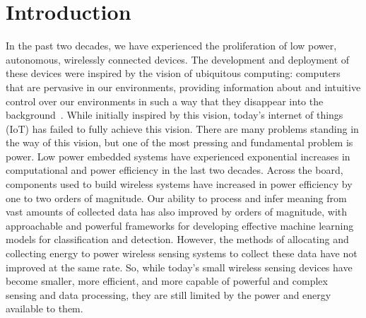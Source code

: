 \chapter{Introduction}
\label{chap:intro}

In the past two decades, we have experienced the proliferation of low power, autonomous, wirelessly connected devices.
The development and deployment of these devices were inspired by the vision of ubiquitous computing: computers that are pervasive in our environments, providing information about and intuitive control over our environments in such a way that they disappear into the background~\cite{weiser1991computer}.
While initially inspired by this vision, today's internet of things (IoT) has failed to fully achieve this vision.
There are many problems standing in the way of this vision, but one of the most pressing and fundamental problem is power.
Low power embedded systems have experienced exponential increases in computational and power efficiency in the last two decades. Across the board, components used to build wireless systems have increased in power efficiency by one to two orders of magnitude.
Our ability to process and infer meaning from vast amounts of collected data has also improved by orders of magnitude, with approachable and powerful frameworks for developing effective machine learning models for classification and detection.
However, the methods of allocating and collecting energy to power wireless sensing systems to collect these data have not improved at the same rate.
So, while today's small wireless sensing devices have become smaller, more efficient, and more capable of powerful and complex sensing and data processing, they are still limited by the power and energy available to them. 

